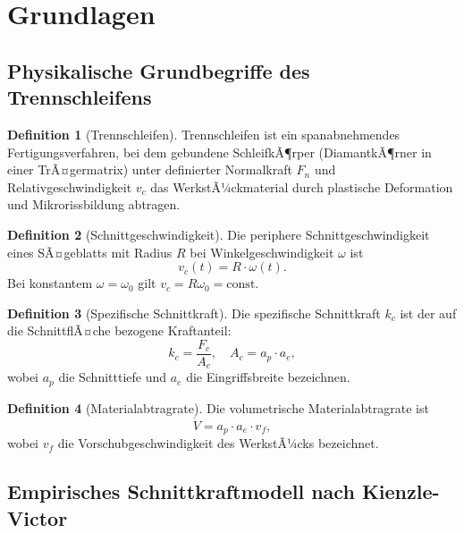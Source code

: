 ﻿\documentclass[a4paper,12pt]{article}
\theoremstyle{definition}
\newtheorem{definition}{Definition}
\begin{document}
\section{Grundlagen}
\label{sec:grundlagen}

\subsection{Physikalische Grundbegriffe des Trennschleifens}

\begin{definition}[Trennschleifen]
Trennschleifen ist ein spanabnehmendes Fertigungsverfahren, bei dem gebundene SchleifkÃ¶rper
(DiamantkÃ¶rner in einer TrÃ¤germatrix) unter definierter Normalkraft $F_n$ und Relativgeschwindigkeit
$v_c$ das WerkstÃ¼ckmaterial durch plastische Deformation und Mikrorissbildung abtragen.
\end{definition}

\begin{definition}[Schnittgeschwindigkeit]
Die periphere Schnittgeschwindigkeit eines SÃ¤ge\-blatts mit Radius $R$ bei Winkelgeschwindigkeit
$\omega$ ist
\[
v_c(t) = R \cdot \omega(t).
\]
Bei konstantem $\omega = \omega_0$ gilt $v_c = R\omega_0 = \mathrm{const}$.
\end{definition}

\begin{definition}[Spezifische Schnittkraft]
Die spezifische Schnittkraft $k_c$ ist der auf die SchnittflÃ¤che bezogene Kraftanteil:
\[
k_c = \frac{F_c}{A_c}, \quad A_c = a_p \cdot a_e,
\]
wobei $a_p$ die Schnitttiefe und $a_e$ die Eingriffsbreite bezeichnen.
\end{definition}

\begin{definition}[Materialabtragrate]
Die volumetrische Materialabtragrate ist
\[
\dot{V} = a_p \cdot a_e \cdot v_f,
\]
wobei $v_f$ die Vorschubgeschwindigkeit des WerkstÃ¼cks bezeichnet.
\end{definition}

\subsection{Empirisches Schnittkraftmodell nach Kienzle-Victor}
\end{document}
